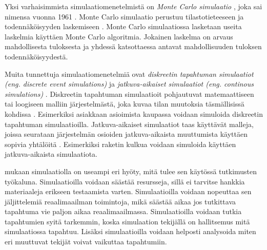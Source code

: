 \documentclass[utf8]{gradu3}
\begin{document}
\begin{comment}
    Mulla on mielikuva, että Monte Carlo olisi nimenä keksitty jo Los Alamosissa 40-luvulla Manhattan projektissa. 
    Sinänsä tätä voisi kuvata vähän täsmällisemmin 
    todennäköisyyksien ja odotustavojen avulla.
\end{comment}
Yksi varhaisimmista simulaatiomenetelmistä on 
\textit{Monte Carlo simulaatio} \parencite{historyOfSimulation1996}, 
joka sai nimensa vuonna 1961 \parencite{monteCarlo1961}.
Monte Carlo simulaatio perustuu tilastotieteeseen ja todennäköisyyden laskemiseen
\parencite{historyOfSimulation1996}.
Monte Carlo simulaatiossa lasketaan useita laskelmia käyttäen Monte Carlo algoritmia.
Jokainen laskelma on arvaus mahdollisesta tuloksesta ja yhdessä katsottaessa
antavat mahdollisuuden tuloksen todennäköisyydestä.

Muita tunnettuja simulaatiomenetelmiä ovat 
\textit{diskreetin tapahtuman simulaatiot (eng. discrete event simulations)}
ja \textit{jatkuva-aikaiset simulaatiot  (eng. continous simulations)}
\parencite{historyOfSimulation1996}.
Diskreetin tapahtuman simulaatioit pohjautuvat matemaattiseen tai loogiseen
malliin järjestelmästä, joka kuvaa tilan muutoksia täsmällisissä kohdissa
\parencite{historyOfSimulation1996}.
Esimerkiksi asiakkaan asioimista kaupassa voidaan simuloida diskreetin 
tapahtuman simulaatioilla.
Jatkuva-aikaiset simulaatiot taas käyttävät malleja, joissa seurataan 
järjestelmän osioiden jatkuva-aikaista muuttumista käyttäen sopivia 
yhtälöitä \parencite{historyOfSimulation1996}. 
Esimerkiksi raketin kulkua voidaan simuloida käyttäen jatkuva-aikaista simulaatiota.

\cite{banks1999introduction} mukaan simulaatiolla on useampi eri hyöty, 
mitä tulee sen käytössä tutkimusten työkaluna. 
Simulaatioilla voidaan säästää resursseja, sillä ei tarvitse hankkia materiaaleja erikseen testaamista varten. 
Simulaatioilla voidaan nopeuttaa sen jäljittelemiä reaalimaailman toimintoja,
mikä säästää aikaa jos tutkittava tapahtuma vie paljon aikaa reaalimaailmassa. Simulaatioilla voidaan tutkia tapahtumien syitä tarkemmin, koska simulaation tekijällä on hallitsemus mitä simulaatiossa tapahtuu.
Lisäksi simulaatioilla voidaan helposti analysoida miten eri muuttuvat tekijät voivat vaikuttaa tapahtumiin. 
\end{document}
